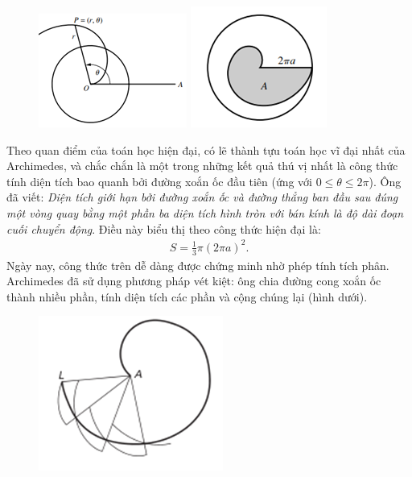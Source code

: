 \begin{multicols}{2}
	\begin{figure}[H]
		\vspace*{-5pt}
		\centering
		\captionsetup{labelformat= empty, justification=centering}
		\includegraphics[height=0.4\linewidth]{7a}
		\includegraphics[height=0.4\linewidth]{7b}
	\end{figure}
	Theo quan điểm của toán học hiện đại, có lẽ thành tựu toán học vĩ đại nhất của Archimedes, và chắc chắn là một trong những kết quả thú vị nhất là công thức tính diện tích bao quanh bởi đường xoắn ốc đầu tiên (ứng với $0 \le \theta  \le 2\pi $). Ông đã viết: \textit{Diện tích giới hạn bởi đường xoắn ốc và đường thẳng ban đầu sau đúng một vòng quay bằng một phần ba diện tích hình tròn với bán kính là độ dài đoạn cuối chuyển động}. Điều này biểu thị theo công thức hiện đại là:  
	\begin{align*}
		S = \frac{1}{3}\pi {\left( {2\pi a} \right)^2}.
	\end{align*}
	Ngày nay, công thức trên dễ dàng được chứng minh nhờ phép tính tích phân. Archimedes đã sử dụng phương pháp vét kiệt: ông chia đường cong xoắn ốc thành nhiều phần, tính diện tích các phần và cộng chúng lại (hình dưới).
	\begin{figure}[H]
		\vspace*{-5pt}
		\centering
		\captionsetup{labelformat= empty, justification=centering}
		\includegraphics[width= 0.65\linewidth]{8}

\end{figure}
\end{multicols}
